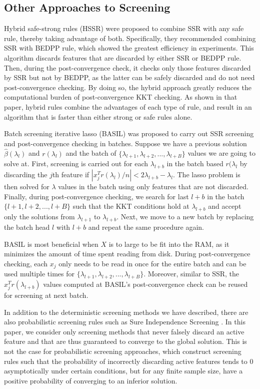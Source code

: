 \documentclass[]{interact}
\theoremstyle{plain}%
\theoremstyle{definition}
\theoremstyle{remark}
\providecommand{\lam}{\lambda}
\begin{document}
\subsection{Other Approaches to Screening}

Hybrid safe-strong rules (HSSR) \citep{Zeng2021} were proposed to combine SSR with any safe rule, thereby taking advantage of both. Specifically, they recommended combining SSR with BEDPP rule, which showed the greatest efficiency in experiments. This algorithm discards features that are discarded by either SSR or BEDPP rule. Then, during the post-convergence check, it checks only those features discarded by SSR but not by BEDPP, as the latter can be safely discarded and do not need post-convergence checking. By doing so, the hybrid approach greatly reduces the computational burden of post-convergence KKT checking.  As shown in that paper, hybrid rules combine the advantages of each type of rule, and result in an algorithm that is faster than either strong or safe rules alone.

Batch screening iterative lasso (BASIL) \citep{qian2019fast} was proposed to carry out SSR screening and post-convergence checking in batches. Suppose we have a previous solution $\hat{\beta}(\lambda_l)$ and $r(\lambda_l)$ and the batch of $\{\lambda_{l+1},\lambda_{l+2},...,\lambda_{l+B}\}$ values we are going to solve at. First, screening is carried out for each $\lambda_{l+b}$ in the batch based $r(\lambda_l$ by discarding the $j$th feature if $|x_j^Tr(\lambda_l)/n|<2\lambda_{l+b}-\lambda_l$. The lasso problem is then solved for $\lam$ values in the batch using only features that are not discarded. Finally, during post-convergence checking, we search for last $l+b$ in the batch $\{l+1,l+2,...,l+B\}$ such that the KKT conditions hold at $\lambda_{l+b}$ and accept only the solutions from $\lambda_{l+1}$ to $\lambda_{l+b}$. Next, we move to a new batch by replacing the batch head $l$ with $l+b$ and repeat the same procedure again.

BASIL is most beneficial when $X$ is to large to be fit into the RAM, as it minimizes the amount of time spent reading from disk. During post-convergence checking, each $x_j$ only needs to be read in once for the entire batch and can be used multiple times for $\{\lambda_{l+1},\lambda_{l+2},...,\lambda_{l+B}\}$. Moreover, similar to SSR, the $x_j^Tr(\lambda_{l+b})$ values computed at BASIL's post-convergence check can be reused for screening at next batch.

In addition to the deterministic screening methods we have described, there are also probabilistic screening rules such as Sure Independence Screening \citep{Fan2008}. In this paper, we consider only screening methods that never falsely discard an active feature and that are thus guaranteed to converge to the global solution. This is not the case for probabilistic screening approaches, which construct screening rules such that the probability of incorrectly discarding active features tends to 0 asymptotically under certain conditions, but for any finite sample size, have a positive probability of converging to an inferior solution.
\end{document}
